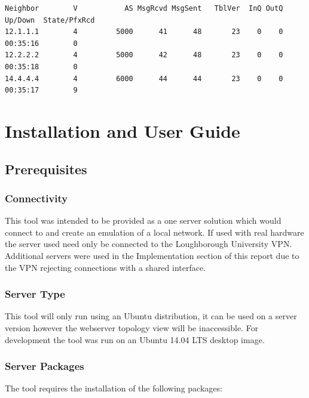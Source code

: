 \documentclass[11pt]{report}
\begin{document}
\begin{appendices}
\begin{lstlisting}
Neighbor        V           AS MsgRcvd MsgSent   TblVer  InQ OutQ Up/Down  State/PfxRcd
12.1.1.1        4         5000      41      48       23    0    0 00:35:16        0
12.2.2.2        4         5000      42      48       23    0    0 00:35:18        0
14.4.4.4        4         6000      44      44       23    0    0 00:35:17        9
\end{lstlisting}

\chapter{Installation and User Guide}

\section{Prerequisites}

\subsection{Connectivity}
This tool was intended to be provided as a one server solution which would connect to and create an emulation of a local network. If used with real hardware the server used need only be connected to the Loughborough University VPN. Additional servers were used in the Implementation section of this report due to the VPN rejecting connections with a shared interface.

\subsection{Server Type}
This tool will only run using an Ubuntu distribution, it can be used on a server version however the webserver topology view will be inaccessible. For development the tool was run on an Ubuntu 14.04 LTS desktop image.

\subsection{Server Packages}
The tool requires the installation of the following packages:


\end{appendices}
\end{document}
